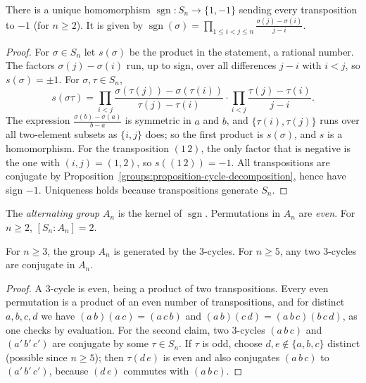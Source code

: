 \begin{proposition}\label{groups:proposition-sign}
There is a unique homomorphism $\operatorname{sgn} \colon S_n \to \{1, -1\}$ sending
every transposition to $-1$ (for $n \geq 2$). It is given by
$\operatorname{sgn}(\sigma) = \prod_{1 \leq i < j \leq n} \frac{\sigma(j) - \sigma(i)}{j - i}$.
\end{proposition}

\begin{proof}
For $\sigma \in S_n$ let $s(\sigma)$ be the product in the statement, a rational
number. The factors $\sigma(j) - \sigma(i)$ run, up to sign, over all differences
$j - i$ with $i < j$, so $s(\sigma) = \pm 1$. For $\sigma, \tau \in S_n$,
\[
s(\sigma\tau) = \prod_{i < j} \frac{\sigma(\tau(j)) - \sigma(\tau(i))}{\tau(j) - \tau(i)} \cdot
\prod_{i < j} \frac{\tau(j) - \tau(i)}{j - i}.
\]
The expression $\frac{\sigma(b) - \sigma(a)}{b - a}$ is symmetric in $a$ and $b$, and
$\{\tau(i), \tau(j)\}$ runs over all two-element subsets as $\{i, j\}$ does; so the first
product is $s(\sigma)$, and $s$ is a homomorphism. For the transposition $(1\,2)$, the
only factor that is negative is the one with $(i, j) = (1, 2)$, so $s((1\,2)) = -1$.
All transpositions are conjugate by Proposition~\ref{groups:proposition-cycle-decomposition},
hence have sign $-1$. Uniqueness holds because transpositions generate $S_n$.
\end{proof}

\begin{definition}\label{groups:definition-alternating}
The \emph{alternating group} $A_n$ is the kernel of $\operatorname{sgn}$. Permutations in
$A_n$ are \emph{even}. For $n \geq 2$, $[S_n : A_n] = 2$.
\end{definition}

\begin{lemma}\label{groups:lemma-three-cycles}
For $n \geq 3$, the group $A_n$ is generated by the $3$-cycles. For $n \geq 5$, any two
$3$-cycles are conjugate in $A_n$.
\end{lemma}

\begin{proof}
A $3$-cycle is even, being a product of two transpositions. Every even permutation
is a product of an even number of transpositions, and for distinct $a, b, c, d$ we
have $(a\,b)(a\,c) = (a\,c\,b)$ and $(a\,b)(c\,d) = (a\,b\,c)(b\,c\,d)$, as one checks by
evaluation. For the second claim, two $3$-cycles $(a\,b\,c)$ and $(a'\,b'\,c')$ are
conjugate by some $\tau \in S_n$. If $\tau$ is odd, choose $d, e \notin \{a, b, c\}$
distinct (possible since $n \geq 5$); then $\tau(d\,e)$ is even and also conjugates
$(a\,b\,c)$ to $(a'\,b'\,c')$, because $(d\,e)$ commutes with $(a\,b\,c)$.
\end{proof}

